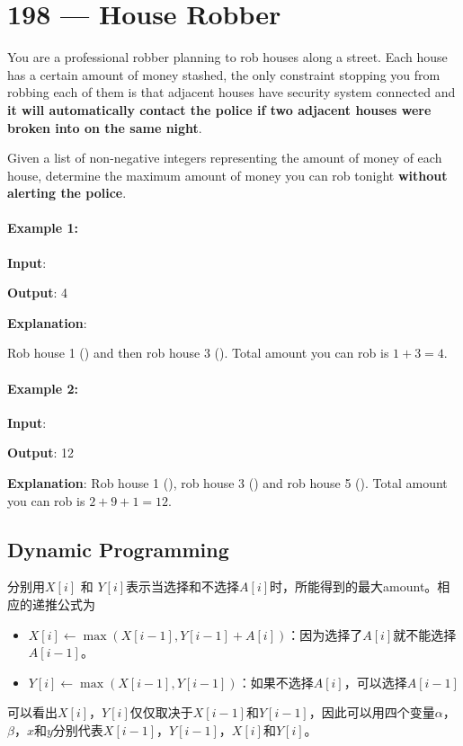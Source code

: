 \section{198 --- House Robber}
You are a professional robber planning to rob houses along a street. Each house has a certain amount of money stashed, the only constraint stopping you from robbing each of them is that adjacent houses have security system connected and \textbf{it will automatically contact the police if two adjacent houses were broken into on the same night}.

Given a list of non-negative integers representing the amount of money of each house, determine the maximum amount of money you can rob tonight \textbf{without alerting the police}.
\paragraph{Example 1:}
\begin{flushleft}
\textbf{Input}: \fcj{[1,2,3,1]}

\textbf{Output}: 4

\textbf{Explanation}: 

Rob house 1 () and then rob house 3 (). Total amount you can rob is $ 1 + 3 = 4$.
\end{flushleft}

\paragraph{Example 2:}
\begin{flushleft}
\textbf{Input}: \fcj{[2,7,9,3,1]}

\textbf{Output}: 12

\textbf{Explanation}:
Rob house 1 (), rob house 3 () and rob house 5 (). Total amount you can rob is $2 + 9 + 1 = 12$.
\end{flushleft}   
\subsection{Dynamic Programming}
分别用$X[i]$ 和 $Y[i]$表示当选择和不选择$A[i]$时，所能得到的最大amount。相应的递推公式为
\begin{itemize}
\item $X[i]\gets\max(X[i-1], Y[i-1] + A[i])$：因为选择了$A[i]$就不能选择$A[i-1]$。
\item $Y[i]\gets\max(X[i-1], Y[i-1])$：如果不选择$A[i]$，可以选择$A[i-1]$
\end{itemize}
可以看出$X[i]$，$Y[i]$仅仅取决于$X[i-1]$和$Y[i-1]$，因此可以用四个变量$\alpha$，$\beta$，$x$和$y$分别代表$X[i-1]$，$Y[i-1]$，$X[i]$和$Y[i]$。
   
